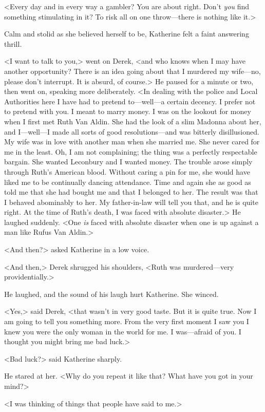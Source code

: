 <Every day and in every way a gambler? You are about right. Don't \emph{you} find something stimulating in it? To risk all on one throw—there is nothing like it.>

Calm and stolid as she believed herself to be, Katherine felt a faint answering thrill.

<I want to talk to you,> went on Derek, <and who knows when I may have another opportunity? There is an idea going about that I murdered my wife—no, please don't interrupt. It is absurd, of course.> He paused for a minute or two, then went on, speaking more deliberately. <In dealing with the police and Local Authorities here I have had to pretend to—well—a certain decency. I prefer not to pretend with you. I meant to marry money. I was on the lookout for money when I first met Ruth Van Aldin. She had the look of a slim Madonna about her, and I—well—I made all sorts of good resolutions—and was bitterly disillusioned. My wife was in love with another man when she married me. She never cared for me in the least. Oh, I am not complaining; the thing was a perfectly respectable bargain. She wanted Leconbury and I wanted money. The trouble arose simply through Ruth's American blood. Without caring a pin for me, she would have liked me to be continually dancing attendance. Time and again she as good as told me that she had bought me and that I belonged to her. The result was that I behaved abominably to her. My father-in-law will tell you that, and he is quite right. At the time of Ruth's death, I was faced with absolute disaster.> He laughed suddenly. <One \emph{is} faced with absolute disaster when one is up against a man like Rufus Van Aldin.>

<And then?> asked Katherine in a low voice.

<And then,> Derek shrugged his shoulders, <Ruth was murdered—very providentially.>

He laughed, and the sound of his laugh hurt Katherine. She winced.

<Yes,> said Derek, <that wasn't in very good taste. But it is quite true. Now I am going to tell you something more. From the very first moment I saw you I knew you were the only woman in the world for me. I was—afraid of you. I thought you might bring me bad luck.>

<Bad luck?> said Katherine sharply.

He stared at her. <Why do you repeat it like that? What have you got in your mind?>

<I was thinking of things that people have said to me.>

